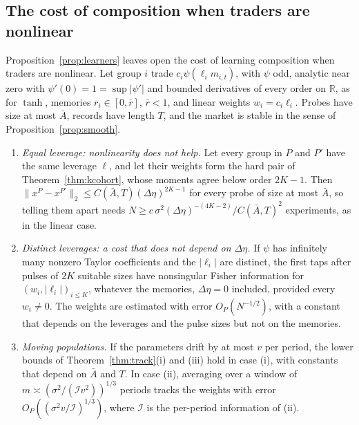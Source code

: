 \subsection{The cost of composition when traders are nonlinear}

Proposition~\ref{prop:learners} leaves open the cost of learning composition when traders are nonlinear. Let group $i$ trade $c_i\psi(\ell_im_{i,t})$, with $\psi$ odd, analytic near zero with $\psi'(0)=1=\sup|\psi'|$ and bounded derivatives of every order on $\mathbb R$, as for $\tanh$, memories $r_i\in[0,\bar r]$, $\bar r<1$, and linear weights $w_i=c_i\ell_i$. Probes have size at most $\bar A$, records have length $T$, and the market is stable in the sense of Proposition~\ref{prop:smooth}.

\begin{proposition}\label{prop:nlcost}
\begin{enumerate}[label=(\roman*),itemsep=1pt]
\item \emph{Equal leverage: nonlinearity does not help.} Let every group in $P$ and $P'$ have the same leverage $\ell$, and let their weights form the hard pair of Theorem~\ref{thm:kcohort}, whose moments agree below order $2K-1$. Then $\|x^P-x^{P'}\|_2\le C(\bar A,T)(\Delta\eta)^{2K-1}$ for every probe of size at most $\bar A$, so telling them apart needs $N\ge c\,\sigma^2(\Delta\eta)^{-(4K-2)}/C(\bar A,T)^2$ experiments, as in the linear case.
\item \emph{Distinct leverages: a cost that does not depend on $\Delta\eta$.} If $\psi$ has infinitely many nonzero Taylor coefficients and the $|\ell_i|$ are distinct, the first taps after pulses of $2K$ suitable sizes have nonsingular Fisher information for $(w_i,|\ell_i|)_{i\le K}$, whatever the memories, $\Delta\eta=0$ included, provided every $w_i\ne0$. The weights are estimated with error $O_P(N^{-1/2})$, with a constant that depends on the leverages and the pulse sizes but not on the memories.
\item \emph{Moving populations.} If the parameters drift by at most $v$ per period, the lower bounds of Theorem~\ref{thm:track}(i) and (iii) hold in case (i), with constants that depend on $\bar A$ and $T$. In case (ii), averaging over a window of $m\asymp(\sigma^2/(\mathcal Iv^2))^{1/3}$ periods tracks the weights with error $O_P((\sigma^2v/\mathcal I)^{1/3})$, where $\mathcal I$ is the per-period information of (ii).
\end{enumerate}
\end{proposition}

